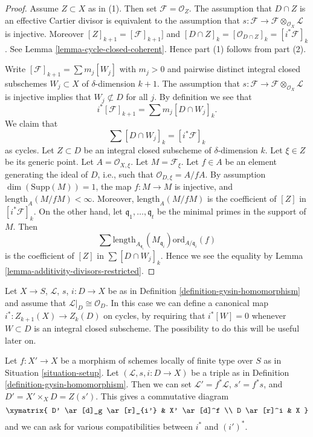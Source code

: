 \begin{proof}
Assume $Z \subset X$ as in (1). Then set $\mathcal{F} = \mathcal{O}_Z$.
The assumption that $D \cap Z$ is an effective Cartier divisor is
equivalent to the assumption that
$s : \mathcal{F} \to \mathcal{F} \otimes_{\mathcal{O}_X} \mathcal{L}$
is injective. Moreover $[Z]_{k + 1} = [\mathcal{F}]_{k + 1}]$
and $[D \cap Z]_k = [\mathcal{O}_{D \cap Z}]_k = [i^*\mathcal{F}]_k$.
See Lemma \ref{lemma-cycle-closed-coherent}.
Hence part (1) follows from part (2).

\medskip\noindent
Write $[\mathcal{F}]_{k + 1} = \sum m_j[W_j]$ with $m_j > 0$
and pairwise distinct integral closed subschemes $W_j \subset X$
of $\delta$-dimension $k + 1$. The assumption that
$s : \mathcal{F} \to \mathcal{F} \otimes_{\mathcal{O}_X} \mathcal{L}$
is injective implies that $W_j \not \subset D$ for all $j$.
By definition we see that
$$
i^*[\mathcal{F}]_{k + 1} = \sum m_j [D \cap W_j]_k.
$$
We claim that
$$
\sum [D \cap W_j]_k = [i^*\mathcal{F}]_k
$$
as cycles.
Let $Z \subset D$ be an integral closed subscheme of $\delta$-dimension
$k$. Let $\xi \in Z$ be its generic point. Let $A = \mathcal{O}_{X, \xi}$.
Let $M = \mathcal{F}_\xi$. Let $f \in A$ be an element generating the
ideal of $D$, i.e., such that $\mathcal{O}_{D, \xi} = A/fA$.
By assumption $\dim(\text{Supp}(M)) = 1$,
the map $f : M \to M$ is injective, and
$\text{length}_A(M/fM) < \infty$. Moreover, $\text{length}_A(M/fM)$
is the coefficient of $[Z]$ in $[i^*\mathcal{F}]_k$. On the
other hand, let $\mathfrak q_1, \ldots, \mathfrak q_t$ be the minimal
primes in the support of $M$. Then
$$
\sum
\text{length}_{A_{\mathfrak q_i}}(M_{\mathfrak q_i})
\text{ord}_{A/\mathfrak q_i}(f)
$$
is the coefficient of $[Z]$ in $\sum [D \cap W_j]_k$.
Hence we see the equality by
Lemma \ref{lemma-additivity-divisors-restricted}.
\end{proof}

\begin{remark}
\label{remark-gysin-on-cycles}
Let $X \to S$, $\mathcal{L}$, $s$, $i : D \to X$ be as in
Definition \ref{definition-gysin-homomorphism} and assume
that $\mathcal{L}|_D \cong \mathcal{O}_D$. In this case we
can define a canonical map $i^* : Z_{k + 1}(X) \to Z_k(D)$
on cycles, by requiring that $i^*[W] = 0$ whenever $W \subset D$
is an integral closed subscheme.
The possibility to do this will be useful later on.
\end{remark}

\begin{remark}
\label{remark-pullback-pairs}
Let $f : X' \to X$ be a morphism of schemes locally of finite type over $S$
as in Situation \ref{situation-setup}. Let $(\mathcal{L}, s, i : D \to X)$
be a triple as in Definition \ref{definition-gysin-homomorphism}.
Then we can set $\mathcal{L}' = f^*\mathcal{L}$, $s' = f^*s$, and
$D' = X' \times_X D = Z(s')$. This gives a commutative diagram
$$
\xymatrix{
D' \ar[d]_g \ar[r]_{i'} & X' \ar[d]^f \\
D \ar[r]^i & X
}
$$
and we can ask for various compatibilities between $i^*$ and $(i')^*$.
\end{remark}

